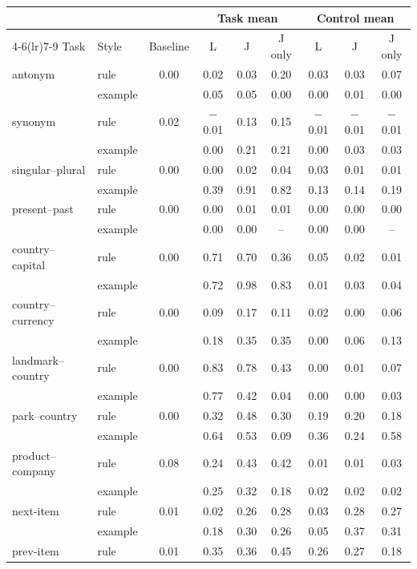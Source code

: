 \begin{tabular}{@{}llccccccc@{}}
\toprule
 & & & \multicolumn{3}{c}{Task mean} & \multicolumn{3}{c}{Control mean} \\
\cmidrule(lr){4-6}\cmidrule(lr){7-9}
Task & Style & Baseline & L & J & J only & L & J & J only \\
\midrule
antonym & rule & 0.00 & 0.02 & 0.03 & 0.20 & 0.03 & 0.03 & 0.07 \\
 & example &  & 0.05 & 0.05 & 0.00 & 0.00 & 0.01 & 0.00 \\
synonym & rule & 0.02 & $-$0.01 & 0.13 & 0.15 & $-$0.01 & $-$0.01 & $-$0.01 \\
 & example &  & 0.00 & 0.21 & 0.21 & 0.00 & 0.03 & 0.03 \\
singular--plural & rule & 0.00 & 0.00 & 0.02 & 0.04 & 0.03 & 0.01 & 0.01 \\
 & example &  & 0.39 & 0.91 & 0.82 & 0.13 & 0.14 & 0.19 \\
present--past & rule & 0.00 & 0.00 & 0.01 & 0.01 & 0.00 & 0.00 & 0.00 \\
 & example &  & 0.00 & 0.00 & -- & 0.00 & 0.00 & -- \\
country--capital & rule & 0.00 & 0.71 & 0.70 & 0.36 & 0.05 & 0.02 & 0.01 \\
 & example &  & 0.72 & 0.98 & 0.83 & 0.01 & 0.03 & 0.04 \\
country--currency & rule & 0.00 & 0.09 & 0.17 & 0.11 & 0.02 & 0.00 & 0.06 \\
 & example &  & 0.18 & 0.35 & 0.35 & 0.00 & 0.06 & 0.13 \\
landmark--country & rule & 0.00 & 0.83 & 0.78 & 0.43 & 0.00 & 0.01 & 0.07 \\
 & example &  & 0.77 & 0.42 & 0.04 & 0.00 & 0.00 & 0.03 \\
park--country & rule & 0.00 & 0.32 & 0.48 & 0.30 & 0.19 & 0.20 & 0.18 \\
 & example &  & 0.64 & 0.53 & 0.09 & 0.36 & 0.24 & 0.58 \\
product--company & rule & 0.08 & 0.24 & 0.43 & 0.42 & 0.01 & 0.01 & 0.03 \\
 & example &  & 0.25 & 0.32 & 0.18 & 0.02 & 0.02 & 0.02 \\
next-item & rule & 0.01 & 0.02 & 0.26 & 0.28 & 0.03 & 0.28 & 0.27 \\
 & example &  & 0.18 & 0.30 & 0.26 & 0.05 & 0.37 & 0.31 \\
prev-item & rule & 0.01 & 0.35 & 0.36 & 0.45 & 0.26 & 0.27 & 0.18 \\

\end{tabular}
